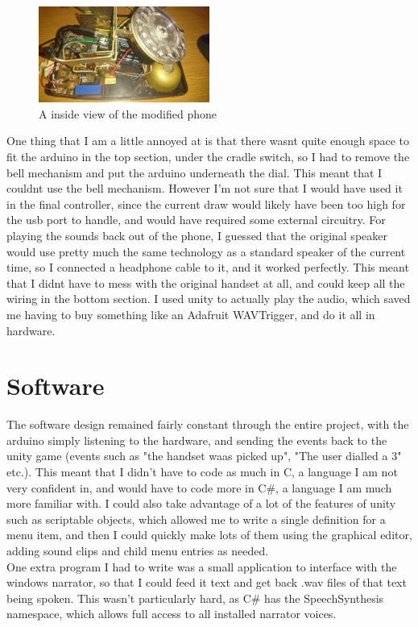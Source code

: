 \documentclass[12pt]{article}
\begin{document}
\begin{figure}[h]
    \centering
    \includegraphics[width=0.5\textwidth]{PhoneInside}
    \caption{A inside view of the modified phone}
\end{figure}

One thing that I am a little annoyed at is that there wasnt quite enough space to fit the arduino in the top section, 
under the cradle switch, so I had to remove the bell mechanism and put the arduino underneath the dial. 
This meant that I couldnt use the bell mechanism. 
However I'm not sure that I would have used it in the final controller, 
since the current draw would likely have been too high for the usb port to handle, 
and would have required some external circuitry.
For playing the sounds back out of the phone, 
I guessed that the original speaker would use pretty much the same technology as a standard speaker of the current time, 
so I connected a headphone cable to it, and it worked perfectly. 
This meant that I didnt have to mess with the original handset at all, 
and could keep all the wiring in the bottom section. I used unity to actually play the audio, 
which saved me having to buy something like an Adafruit WAVTrigger, and do it all in hardware.

\FloatBarrier
\section{Software} %
The software design remained fairly constant through the entire project, 
with the arduino simply listening to the hardware, 
and sending the events back to the unity game (events such as "the handset waas picked up", 
"The user dialled a 3" etc.). This meant that I didn't have to code as much in C, 
a language I am not very confident in, and would have to code more in C\#, 
a language I am much more familiar with. 
I could also take advantage of a lot of the features of unity such as scriptable objects, 
which allowed me to write a single definition for a menu item, 
and then I could quickly make lots of them using the graphical editor, 
adding sound clips and child menu entries as needed.\\
One extra program I had to write was a small application to interface with the windows narrator,
so that I could feed it text and get back .wav files of that text being spoken.
This wasn't particularly hard, as C\# has the SpeechSynthesis namespace,
which allows full access to all installed narrator voices.
\end{document}
